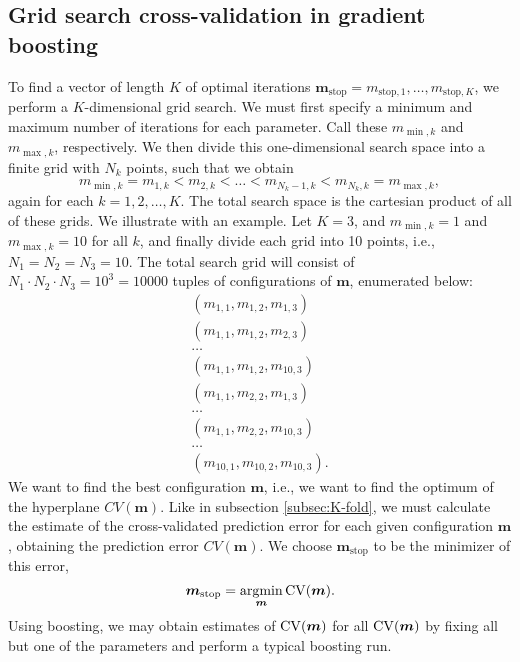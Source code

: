\subsection{Grid search cross-validation in gradient boosting}\label{grid-search}
To find a vector of length $K$ of optimal iterations $\boldsymbol{m}_{\text{stop}}=m_{\text{stop},1},\ldots,m_{\text{stop},K}$, we perform a $K$-dimensional grid search.
We must first specify a minimum and maximum number of iterations for each parameter.
Call these $m_{\min,k}$ and $m_{\max,k}$, respectively.
We then divide this one-dimensional search space into a finite grid with $N_k$ points, such that we obtain
\begin{equation} 
    m_{\min,k}=m_{1,k}<m_{2,k}<\ldots<m_{N_k-1,k}<m_{N_k,k}=m_{\max,k},
\end{equation}
again for each $k=1,2,\ldots,K$.
The total search space is the cartesian product of all of these grids.
We illustrate with an example. Let $K=3$, and $m_{\min,k}=1$ and $m_{\max,k}=10$ for all $k$, and finally divide each grid into 10 points, i.e., $N_1=N_2=N_3=10$.
The total search grid will consist of $N_1\cdot N_2\cdot N_3=10^3=10000$ tuples of configurations of $\boldsymbol{m}$, enumerated below:
\begin{align*}
    \left(m_{1,1},m_{1,2},m_{1,3}\right) \\
    \left(m_{1,1},m_{1,2},m_{2,3}\right) \\
    \ldots \\
    \left(m_{1,1},m_{1,2},m_{10,3}\right) \\
    \left(m_{1,1},m_{2,2},m_{1,3}\right) \\
    \ldots \\
    \left(m_{1,1},m_{2,2},m_{10,3}\right) \\
    \ldots \\
    \left(m_{10,1},m_{10,2},m_{10,3}\right).
\end{align*}
We want to find the best configuration $\boldsymbol{m}$, i.e., we want to find the optimum of the hyperplane $CV(\boldsymbol{m})$.
Like in subsection \ref{subsec:K-fold}, we must calculate the estimate of the cross-validated prediction error for each given configuration $\boldsymbol{m}$, obtaining the prediction error $CV(\boldsymbol{m})$.
We choose $\boldsymbol{m}_{\text{stop}}$ to be the minimizer of this error,
\begin{equation*}
    \boldsymbol{m}_{\text{stop}}=\operatorname*{argmin}_{\boldsymbol{m}}\operatorname{CV}(\boldsymbol{m}).
\end{equation*}
Using boosting, we may obtain estimates of $\operatorname{CV}(\boldsymbol{m})$ for all $\operatorname{CV}(\boldsymbol{m})$ by fixing all but one of the parameters and perform a typical boosting run.
